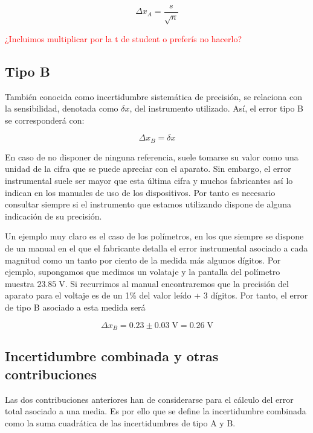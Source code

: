 \documentclass{book}
\begin{document}
\begin{equation}
  \Delta x_A = \frac{s}{\sqrt{n}}
\end{equation}

\textcolor{red}{¿Incluimos multiplicar por la t de student o preferís no hacerlo?}

\subsection{Tipo B}
También conocida como incertidumbre sistemática de precisión, se relaciona con la sensibilidad,
denotada como $\delta x$, del instrumento utilizado. Así, el error tipo B se corresponderá con:

\begin{equation}
  \Delta x_B = \delta x
\end{equation}

En caso de no disponer de ninguna referencia, suele tomarse su valor como una unidad de la cifra 
que se puede apreciar con el aparato. Sin embargo, el error instrumental suele ser mayor que esta 
última cifra y muchos fabricantes así lo indican en los manuales de uso de los dispositivos. Por 
tanto es necesario consultar siempre si el instrumento que estamos utilizando dispone de alguna 
indicación de su precisión.

Un ejemplo muy claro es el caso de los polímetros, en los que siempre se dispone de un manual en
el que el fabricante detalla el error instrumental asociado a cada magnitud como un tanto por
ciento de la medida más algunos dígitos. Por ejemplo, supongamos que medimos un volataje y
la pantalla del polímetro muestra $23.85 \; \textrm{V}$. Si recurrimos al manual encontraremos que la precisión
del aparato para el voltaje es de un 1\% del valor leído + 3 dígitos. Por tanto, el error de tipo
B asociado a esta medida será

\begin{equation}
  \Delta x_B = 0.23 \pm 0.03 \; \textrm{V} = 0.26 \; \textrm{V}
\end{equation}

\subsection{Incertidumbre combinada y otras contribuciones}

Las dos contribuciones anteriores han de considerarse para el cálculo del error total asociado a
una media. Es por ello que se define la incertidumbre combinada como la suma cuadrática de las
incertidumbres de tipo A y B.
\end{document}
